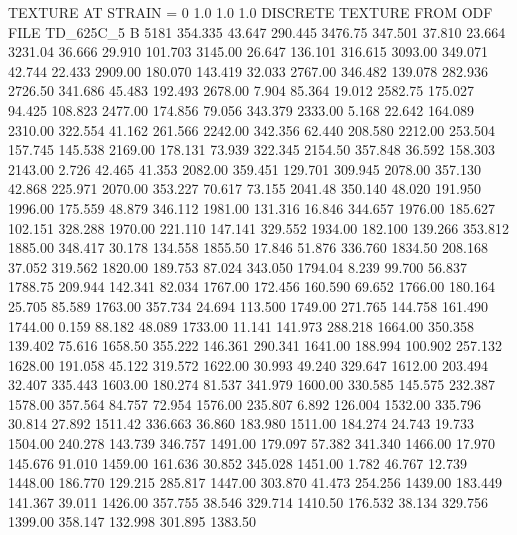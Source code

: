 TEXTURE AT STRAIN = 0
1.0   1.0   1.0
DISCRETE TEXTURE FROM ODF FILE TD_625C_5
B 5181
 354.335   43.647  290.445      3476.75
 347.501   37.810   23.664      3231.04
  36.666   29.910  101.703      3145.00
  26.647  136.101  316.615      3093.00
 349.071   42.744   22.433      2909.00
 180.070  143.419   32.033      2767.00
 346.482  139.078  282.936      2726.50
 341.686   45.483  192.493      2678.00
   7.904   85.364   19.012      2582.75
 175.027   94.425  108.823      2477.00
 174.856   79.056  343.379      2333.00
   5.168   22.642  164.089      2310.00
 322.554   41.162  261.566      2242.00
 342.356   62.440  208.580      2212.00
 253.504  157.745  145.538      2169.00
 178.131   73.939  322.345      2154.50
 357.848   36.592  158.303      2143.00
   2.726   42.465   41.353      2082.00
 359.451  129.701  309.945      2078.00
 357.130   42.868  225.971      2070.00
 353.227   70.617   73.155      2041.48
 350.140   48.020  191.950      1996.00
 175.559   48.879  346.112      1981.00
 131.316   16.846  344.657      1976.00
 185.627  102.151  328.288      1970.00
 221.110  147.141  329.552      1934.00
 182.100  139.266  353.812      1885.00
 348.417   30.178  134.558      1855.50
  17.846   51.876  336.760      1834.50
 208.168   37.052  319.562      1820.00
 189.753   87.024  343.050      1794.04
   8.239   99.700   56.837      1788.75
 209.944  142.341   82.034      1767.00
 172.456  160.590   69.652      1766.00
 180.164   25.705   85.589      1763.00
 357.734   24.694  113.500      1749.00
 271.765  144.758  161.490      1744.00
   0.159   88.182   48.089      1733.00
  11.141  141.973  288.218      1664.00
 350.358  139.402   75.616      1658.50
 355.222  146.361  290.341      1641.00
 188.994  100.902  257.132      1628.00
 191.058   45.122  319.572      1622.00
  30.993   49.240  329.647      1612.00
 203.494   32.407  335.443      1603.00
 180.274   81.537  341.979      1600.00
 330.585  145.575  232.387      1578.00
 357.564   84.757   72.954      1576.00
 235.807    6.892  126.004      1532.00
 335.796   30.814   27.892      1511.42
 336.663   36.860  183.980      1511.00
 184.274   24.743   19.733      1504.00
 240.278  143.739  346.757      1491.00
 179.097   57.382  341.340      1466.00
  17.970  145.676   91.010      1459.00
 161.636   30.852  345.028      1451.00
   1.782   46.767   12.739      1448.00
 186.770  129.215  285.817      1447.00
 303.870   41.473  254.256      1439.00
 183.449  141.367   39.011      1426.00
 357.755   38.546  329.714      1410.50
 176.532   38.134  329.756      1399.00
 358.147  132.998  301.895      1383.50
